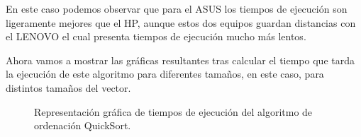 \documentclass{homework}
\begin{document}
    En este caso podemos observar que para el ASUS los tiempos de ejecución son ligeramente 
    mejores que el HP, aunque estos dos equipos guardan distancias con el LENOVO el cual 
    presenta tiempos de ejecución mucho más lentos.

    Ahora vamos a mostrar las gráficas resultantes tras calcular el tiempo que tarda la ejecución de este algoritmo para diferentes
    tamaños, en este caso, para distintos tamaños del vector.

    \begin{figure}
        \centering


        \caption{Representación gráfica de tiempos de ejecución del algoritmo de ordenación QuickSort.}

        \label{emp:quicksort}
    \end{figure}
\end{document}
